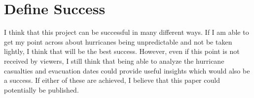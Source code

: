 \documentclass{proc}
\begin{document}
\section{Define Success}

I think that this project can be successful in many different ways. If I am able to get my point across about hurricanes being unpredictable and not be taken lightly, I think that will be the best success. However, even if this point is not received by viewers, I still think that being able to analyze the hurricane casualties and evacuation dates could provide useful insights which would also be a success. If either of these are achieved, I believe that this paper could potentially be published.



\end{document}
